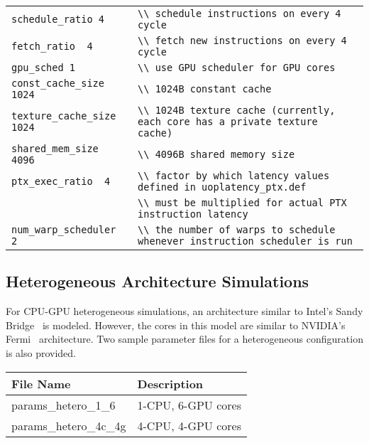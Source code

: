\begin{tabular}{l l}
 \Verb+schedule_ratio 4+ & \Verb+\\ schedule instructions on every 4 cycle+ \\
 \Verb+fetch_ratio  4+ & \Verb+\\ fetch new instructions on every 4 cycle+ \\
 \Verb+gpu_sched 1+ & \Verb+\\ use GPU scheduler for GPU cores+ \\ %
 \Verb+const_cache_size  1024+ & \Verb+\\ 1024B constant cache+ \\
 \Verb+texture_cache_size 1024+ & \Verb+\\ 1024B texture cache (currently, each core has a private texture cache)+ \\
 \Verb+shared_mem_size 4096+ & \Verb+\\ 4096B shared memory size + \\
 \Verb+ptx_exec_ratio  4+ & \Verb+\\ factor by which latency values defined in uoplatency_ptx.def+ \\
 \Verb++			     & \Verb+\\ must be multiplied for actual PTX instruction latency+ \\
 \Verb+num_warp_scheduler 2+ & \Verb+\\ the number of warps to schedule whenever instruction scheduler is run+
\end{tabular}

\subsection{Heterogeneous Architecture Simulations}

For CPU-GPU heterogeneous simulations, an architecture similar to Intel's Sandy
Bridge~\cite{sandybridge} is modeled. However, the \gpu cores in this model are
similar to NVIDIA's Fermi~\cite{fermi} architecture. Two sample parameter files 
for a heterogeneous configuration is also provided.

\begin{center}
 \begin{tabular}{| l | l |}
  \hline
  File Name & Description \\ \hline \hline
  params\_hetero\_1\_6 &  1-CPU, 6-GPU cores \\
  params\_hetero\_4c\_4g &  4-CPU, 4-GPU cores \\
  \hline
 \end{tabular}
\end{center}

